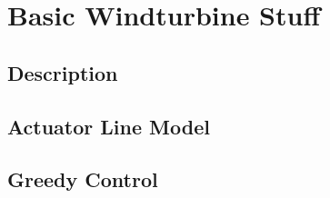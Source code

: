 \section{Basic Windturbine Stuff}
\subsection{Description}
\subsection{Actuator Line Model}
\subsection{Greedy Control}